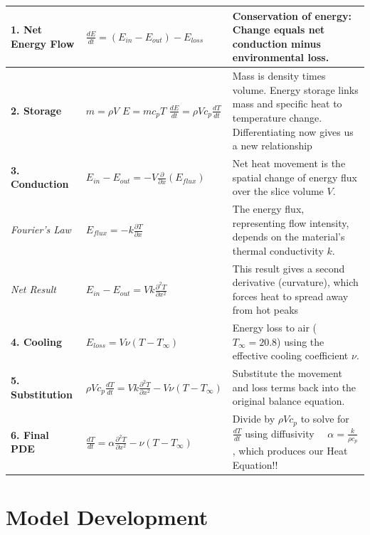 \documentclass[11pt]{article}
\begin{document}
\begin{onehalfspace}
\begin{table}[h]
\begin{tabularx}{\textwidth}{l p{5.5cm} X}
\midrule
\textbf{1. Net Energy Flow} & $\frac{dE}{dt} = (E_{in} - E_{out}) - E_{loss}$ & Conservation of energy: Change equals net \, \, \, \, conduction minus environmental loss. \\
\midrule
\textbf{2. Storage} & $m = \rho V$ \newline $E = m c_p T$ \newline $\frac{dE}{dt} = \rho V c_p \frac{dT}{dt}$ & Mass is density times volume. Energy storage links mass and specific heat to temperature change. \, \, Differentiating now gives us a new relationship\\
\midrule
\textbf{3. Conduction} & $E_{in} - E_{out} = -V \frac{\partial}{\partial x}(E_{flux})$ & Net heat movement is the spatial change of energy flux over the slice volume $V$. \\
\addlinespace
\textit{Fourier's Law} & $E_{flux} = -k \frac{\partial T}{\partial x}$ & The energy flux, representing flow intensity, \, \,depends on the material's thermal conductivity $k$. \\
\addlinespace
\textit{Net Result} & $E_{in} - E_{out} = V k \frac{\partial^2 T}{\partial x^2}$ & This result gives a second derivative (curvature), which forces heat to spread away from hot peaks \\
\midrule
\textbf{4. Cooling} & $E_{loss} = V \nu (T - T_\infty)$ & Energy loss to air ($T_\infty = 20.8$) using the effective cooling coefficient $\nu$. \\
\midrule
\textbf{5. Substitution} & $\rho V c_p \frac{dT}{dt} = V k \frac{\partial^2 T}{\partial x^2} - V \nu (T - T_\infty)$ & Substitute the movement and loss terms back into the original balance equation. \\
\midrule
\textbf{6. Final PDE} & $\frac{dT}{dt} = \alpha \frac{\partial^2 T}{\partial x^2} - \nu(T - T_\infty)$ & Divide by $\rho V c_p$ to solve for $\frac{dT}{dt}$ using diffusivity \, \, $\alpha = \frac{k}{\rho c_p}$, which produces our Heat Equation!! \\
\bottomrule
\end{tabularx}
\end{table}

\vspace{6cm}
\section*{Model Development}
    

\end{onehalfspace}
\end{document}
